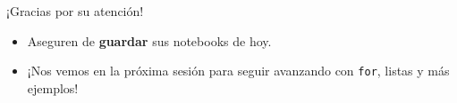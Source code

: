 \documentclass[10pt]{beamer}
\begin{document}
\begin{frame}
  \Huge{\centerline{¡Gracias por su atención!}}
  \vspace{0.4cm}
  \normalsize
  \begin{itemize}
    \item Aseguren de \textbf{guardar} sus notebooks de hoy.
    \item ¡Nos vemos en la próxima sesión para seguir avanzando con \texttt{for}, listas y más ejemplos!
  \end{itemize}
\end{frame}
\end{document}
